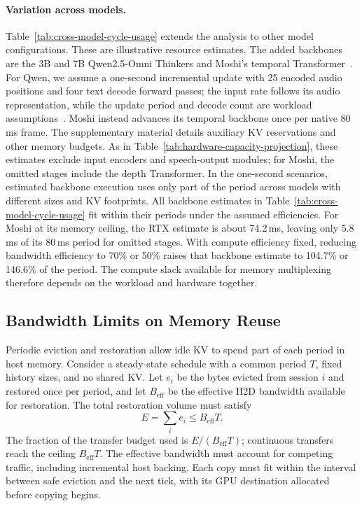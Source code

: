 \paragraph{Variation across models.}
Table~\ref{tab:cross-model-cycle-usage} extends the analysis to other model configurations.
These are illustrative resource estimates.
The added backbones are the 3B and 7B Qwen2.5-Omni Thinkers and Moshi's temporal Transformer~\cite{qwen2025omni3bconfig,qwen2025omni7bconfig,defossez2024moshi,kyutai2026moshiconfig}.
For Qwen, we assume a one-second incremental update with 25 encoded audio positions and four text decode forward passes; the input rate follows its audio representation, while the update period and decode count are workload assumptions~\cite{xu2025qwenomni}.
Moshi instead advances its temporal backbone once per native 80\,ms frame.
The supplementary material details auxiliary KV reservations and other memory budgets.
As in Table~\ref{tab:hardware-capacity-projection}, these estimates exclude input encoders and speech-output modules; for Moshi, the omitted stages include the depth Transformer.
In the one-second scenarios, estimated backbone execution uses only part of the period across models with different sizes and KV footprints.
All backbone estimates in Table~\ref{tab:cross-model-cycle-usage} fit within their periods under the assumed efficiencies.
For Moshi at its memory ceiling, the RTX estimate is about 74.2\,ms, leaving only 5.8\,ms of its 80\,ms period for omitted stages.
With compute efficiency fixed, reducing bandwidth efficiency to 70\% or 50\% raises that backbone estimate to 104.7\% or 146.6\% of the period.
The compute slack available for memory multiplexing therefore depends on the workload and hardware together.


\subsection{Bandwidth Limits on Memory Reuse}
\label{sec:opportunity}

Periodic eviction and restoration allow idle KV to spend part of each period in host memory.
Consider a steady-state schedule with a common period $T$, fixed history sizes, and no shared KV.
Let $e_i$ be the bytes evicted from session $i$ and restored once per period, and let $B_{\mathrm{eff}}$ be the effective H2D bandwidth available for restoration.
The total restoration volume must satisfy
\begin{equation}
  E=\sum_i e_i \le B_{\mathrm{eff}}T.
  \label{eq:transfer-budget}
\end{equation}
The fraction of the transfer budget used is $E/(B_{\mathrm{eff}}T)$; continuous transfers reach the ceiling $B_{\mathrm{eff}}T$.
The effective bandwidth must account for competing traffic, including incremental host backing.
Each copy must fit within the interval between safe eviction and the next tick, with its GPU destination allocated before copying begins.


